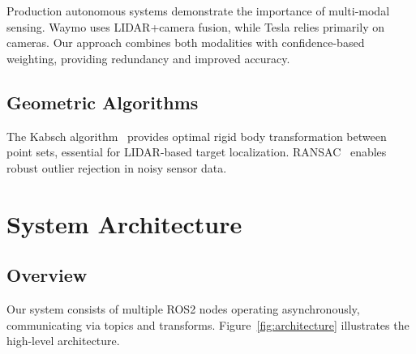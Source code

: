 \documentclass[11pt,a4paper]{article}
\begin{document}
Production autonomous systems demonstrate the importance of multi-modal sensing. Waymo uses LIDAR+camera fusion, while Tesla relies primarily on cameras. Our approach combines both modalities with confidence-based weighting, providing redundancy and improved accuracy.

\subsection{Geometric Algorithms}

The Kabsch algorithm~\cite{kabsch1976solution} provides optimal rigid body transformation between point sets, essential for LIDAR-based target localization. RANSAC~\cite{fischler1981random} enables robust outlier rejection in noisy sensor data.

\section{System Architecture}

\subsection{Overview}

Our system consists of multiple ROS2 nodes operating asynchronously, communicating via topics and transforms. Figure~\ref{fig:architecture} illustrates the high-level architecture.
\end{document}
